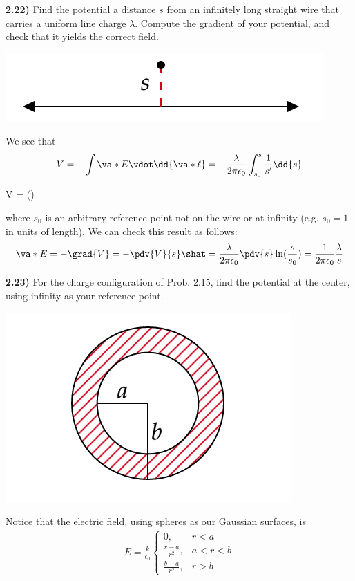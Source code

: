 \documentclass[12pt,a4paper]{article}
\newcommand{\prob}[2]{\textbf{#1)} #2}
\begin{document}
\prob{2.22}{Find the potential a distance $s$ from an infinitely long straight wire that carries a uniform line charge $\lambda$. Compute the gradient of your potential, and check that it yields the correct field.}

\bef
\includegraphics[scale=0.5]{fig1.png}
\eef

We see that
\begin{align*}
V = -\int \va*{E} \vdot \dd{\va*{\ell}} = -\frac{\lambda}{2\pi\epsilon_0}\int_{s_0}^{s} \frac{1}{s'} \dd{s}
\end{align*}
\begin{eqbox}
V = \ln()
\end{eqbox}
where $s_0$ is an arbitrary reference point not on the wire or at infinity (e.g. $s_0 = 1$ in units of length). We can check this result as follows:
\begin{align*}
\va*{E} = -\grad{V} = -\pdv{V}{s}\shat = \frac{\lambda}{2\pi\epsilon_0}\pdv{s}\ln(\frac{s}{s_0}) =  \frac{1}{2\pi\epsilon_0}\frac{\lambda}{s}
\end{align*}

\prob{2.23}{For the charge configuration of Prob. 2.15, find the potential at the center, using infinity as your reference point.}

\bef
\includegraphics[scale=0.5]{fig2.png}
\eef

Notice that the electric field, using spheres as our Gaussian surfaces, is
\begin{align*}
E = \frac{k}{\epsilon_0}\begin{cases}
0, & r < a \\
\frac{r-a}{r^2}, & a < r < b \\
\frac{b-a}{r^2}, & r > b
\end{cases}
\end{align*}
\end{document}
